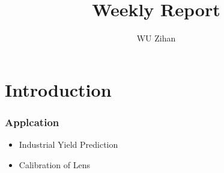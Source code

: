 \documentclass{beamer}
\title{Weekly Report}
\author{WU Zihan}
\begin{document}
\maketitle

\section{Introduction}
\begin{frame}
    \frametitle{Applcation}
    \begin{itemize}
        \item Industrial Yield Prediction
        \item Calibration of Lens
    \end{itemize}
\end{frame}
\end{document}
